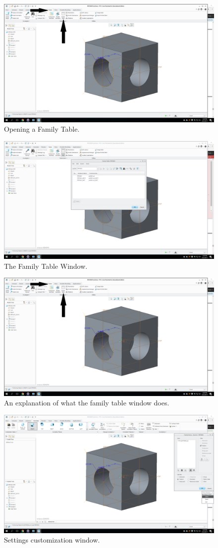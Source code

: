 \begin{figure}[ht!]
\centering
  \includegraphics[width=0.7\linewidth]{CAD/Technique/FamilyTableFolder/Capture1_1.png}
  \caption{Opening a Family Table.}
  \label{fig:Step1}
\end{figure}

\begin{figure}[ht!]
\centering
  \includegraphics[width=0.7\linewidth]{CAD/Technique/FamilyTableFolder/Capture2.png}
  \caption{The Family Table Window.}
  \label{fig:Step2}
\end{figure}

\begin{figure}[ht!]
\centering
  \includegraphics[width=0.7\linewidth]{CAD/Technique/FamilyTableFolder/Capture1_1.png}
  \caption{An explanation of what the family table window does.}
  \label{fig:master1}
\end{figure}
  
\begin{figure}[ht!]
\centering
  \includegraphics[width=0.7\linewidth]{CAD/Technique/FamilyTableFolder/Capture8.png}
  \caption{Settings customization window.}
  \label{fig:Step4}
\end{figure}
  
